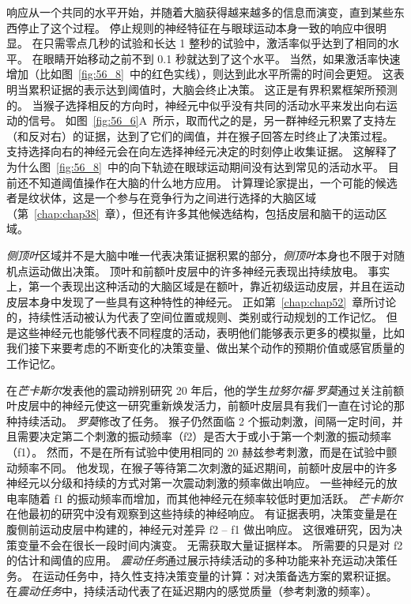 响应从一个共同的水平开始，并随着大脑获得越来越多的信息而演变，直到某些东西停止了这个过程。
停止规则的神经特征在与眼球运动本身一致的响应中很明显。
在只需零点几秒的试验和长达 1 整秒的试验中，激活率似乎达到了相同的水平。
在眼睛开始移动之前不到 0.1 秒就达到了这个水平。
当然，如果激活率快速增加（比如图~\ref{fig:56_8}~中的红色实线），则达到此水平所需的时间会更短。
这表明当累积证据的表示达到阈值时，大脑会终止决策。
这正是有界积累框架所预测的。
当猴子选择相反的方向时，神经元中似乎没有共同的活动水平来发出向右运动的信号。
如图~\ref{fig:56_6}A~所示，取而代之的是，另一群神经元积累了支持左（和反对右）的证据，达到了它们的阈值，并在猴子回答左时终止了决策过程。
支持选择向右的神经元会在向左选择神经元决定的时刻停止收集证据。
这解释了为什么图~\ref{fig:56_8}~中的向下轨迹在眼球运动期间没有达到常见的活动水平。
目前还不知道阈值操作在大脑的什么地方应用。
计算理论家提出，一个可能的候选者是纹状体，这是一个参与在竞争行为之间进行选择的大脑区域（第~\ref{chap:chap38}~章），但还有许多其他候选结构，包括皮层和脑干的运动区域。


\textit{侧顶叶}区域并不是大脑中唯一代表决策证据积累的部分，\textit{侧顶叶}本身也不限于对随机点运动做出决策。
顶叶和前额叶皮层中的许多神经元表现出持续放电。
事实上，第一个表现出这种活动的大脑区域是在额叶，靠近初级运动皮层，并且在运动皮层本身中发现了一些具有这种特性的神经元。
正如第~\ref{chap:chap52}~章所讨论的，持续性活动被认为代表了空间位置或规则、类别或行动规划的工作记忆。
但是这些神经元也能够代表不同程度的活动，表明他们能够表示更多的模拟量，比如我们接下来要考虑的不断变化的决策变量、做出某个动作的预期价值或感官质量的工作记忆。


在\textit{芒卡斯尔}发表他的震动辨别研究 20 年后，他的学生\textit{拉努尔福$\cdot$罗莫}通过关注前额叶皮层中的神经元使这一研究重新焕发活力，前额叶皮层具有我们一直在讨论的那种持续活动。
\textit{罗莫}修改了任务。
猴子仍然面临 2 个振动刺激，间隔一定时间，并且需要决定第二个刺激的振动频率（f2）是否大于或小于第一个刺激的振动频率（f1）。
然而，不是在所有试验中使用相同的 20 赫兹参考刺激，而是在试验中颤动频率不同。
他发现，在猴子等待第二次刺激的延迟期间，前额叶皮层中的许多神经元以分级和持续的方式对第一次震动刺激的频率做出响应。
一些神经元的放电率随着 f1 的振动频率而增加，而其他神经元在频率较低时更加活跃。
\textit{芒卡斯尔}在他最初的研究中没有观察到这些持续的神经响应。
有证据表明，决策变量是在腹侧前运动皮层中构建的，神经元对差异 f2 – f1 做出响应。
这很难研究，因为决策变量不会在很长一段时间内演变。
无需获取大量证据样本。
所需要的只是对 f2 的估计和阈值的应用。
\textit{震动任务}通过展示持续活动的多种功能来补充运动决策任务。
在运动任务中，持久性支持决策变量的计算：对决策备选方案的累积证据。
在\textit{震动任务}中，持续活动代表了在延迟期内的感觉质量（参考刺激的频率）。



